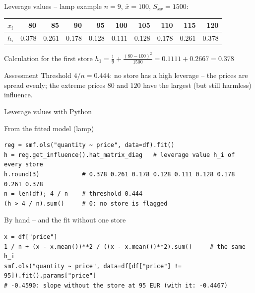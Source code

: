 \documentclass[aspectratio=169,11pt]{beamer}
\begin{document}
\begin{frame}{Leverage values -- lamp example}
  $n=9$, $\bar x=100$, $S_{xx}=1500$:
  \begin{center}
    \renewcommand{\arraystretch}{1.2}
    \begin{tabular}{l|rrrrrrrrr}
      \toprule
      $x_i$ & 80 & 85 & 90 & 95 & 100 & 105 & 110 & 115 & 120 \\
      \midrule
      $h_i$ & $0.378$ & $0.261$ & $0.178$ & $0.128$ & $0.111$ & $0.128$ & $0.178$ & $0.261$ & $0.378$ \\
      \bottomrule
    \end{tabular}
  \end{center}
  \begin{exampleblock}{Calculation for the first store}
    $h_1=\frac19+\frac{(80-100)^2}{1500}=0.1111+0.2667=0.378$
  \end{exampleblock}
  \begin{block}{Assessment}
    Threshold $4/n=0.444$: no store has a high leverage -- the prices are
    spread evenly; the extreme prices $80$ and $120$ have the largest (but
    still harmless) influence.
  \end{block}
\end{frame}

\begin{frame}[fragile]{Leverage values with Python}
  \begin{block}{From the fitted model (lamp)}
\begin{lstlisting}
reg = smf.ols("quantity ~ price", data=df).fit()
h = reg.get_influence().hat_matrix_diag   # leverage value h_i of every store
h.round(3)            # 0.378 0.261 0.178 0.128 0.111 0.128 0.178 0.261 0.378
n = len(df); 4 / n    # threshold 0.444
(h > 4 / n).sum()     # 0: no store is flagged
\end{lstlisting}
  \end{block}
  \begin{block}{By hand -- and the fit without one store}
\begin{lstlisting}
x = df["price"]
1 / n + (x - x.mean())**2 / ((x - x.mean())**2).sum()     # the same h_i
smf.ols("quantity ~ price", data=df[df["price"] != 95]).fit().params["price"]
# -0.4590: slope without the store at 95 EUR (with it: -0.4467)
\end{lstlisting}
  \end{block}
\end{frame}
\end{document}
